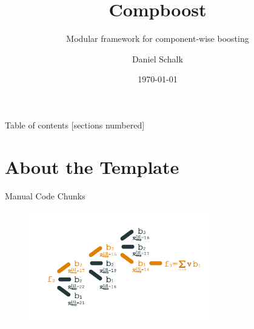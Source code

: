 





\title{Compboost}
\subtitle{Modular framework for component-wise boosting}
\date{\today}
\author{Daniel Schalk}


\usepackage{Sweave}

\let\OldSchunk\Schunk
\let\endOldSchunk\endSchunk

\renewenvironment{Schunk}
 {\small\begin{Shaded}\OldSchunk}
 {\endOldSchunk\end{Shaded}\normalsize}

 





\maketitle

\begin{frame}[plain]{Table of contents}
	[sections numbered]
	\tableofcontents[hideallsubsections]
\end{frame}


\section{About the Template}
\begin{frame}[fragile]{Manual Code Chunks}

\begin{figure}
\centering
\includegraphics[width=0.7\textwidth]{images/comp_boosting.png}
\end{figure}

\end{frame}

